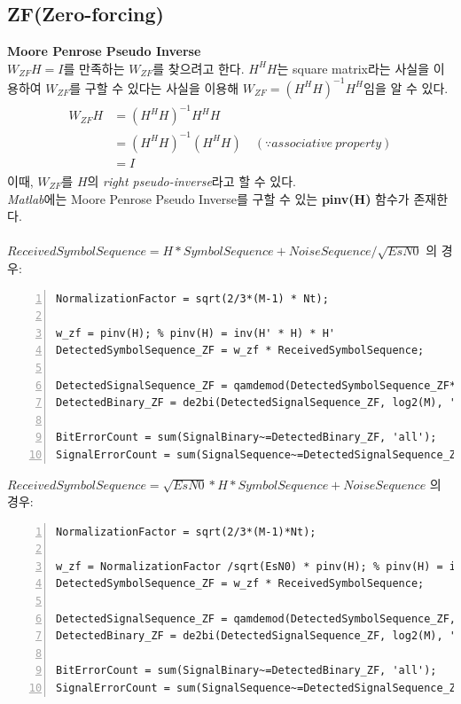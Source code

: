 \documentclass{article}
\newcommand{\bd}{\textbf} %
\begin{document}
\subsection{ZF(Zero-forcing)}
\bd{Moore Penrose Pseudo Inverse}\\
$W_{ZF}H=I$를 만족하는 $W_{ZF}$를 찾으려고 한다. $H^H H$는 square matrix라는 사실을 이용하여 $W_{ZF}$를 구할 수 있다는 사실을 이용해 $W_{ZF}=(H^H H)^{-1}H^H$임을 알 수 있다.
\begin{gather}
	\begin{split}
		W_{ZF}H&=(H^H H)^{-1}H^H H\\
		&=(H^H H)^{-1}(H^H H) \quad (\because associative\ property)\\
		&=I
	\end{split}
\end{gather}
이때, $W_{ZF}$를 $H$의 \textsl{right pseudo-inverse}라고 할 수 있다.\\
\textsl{Matlab}에는 Moore Penrose Pseudo Inverse를 구할 수 있는 \bd{pinv(H)} 함수가 존재한다.\\
\\
$ReceivedSymbolSequence = H * SymbolSequence + NoiseSequence / \sqrt{EsN0}$ 의 경우:
\begin{lstlisting}[style=Matlab-editor, frame=single, numbers=left,]
NormalizationFactor = sqrt(2/3*(M-1) * Nt);

w_zf = pinv(H); % pinv(H) = inv(H' * H) * H'
DetectedSymbolSequence_ZF = w_zf * ReceivedSymbolSequence;

DetectedSignalSequence_ZF = qamdemod(DetectedSymbolSequence_ZF*NormalizationFactor, M);
DetectedBinary_ZF = de2bi(DetectedSignalSequence_ZF, log2(M), 'left-msb');

BitErrorCount = sum(SignalBinary~=DetectedBinary_ZF, 'all');
SignalErrorCount = sum(SignalSequence~=DetectedSignalSequence_ZF, 'all');
\end{lstlisting}
\newpage
\noindent
$ReceivedSymbolSequence = \sqrt{EsN0} * H * SymbolSequence + NoiseSequence$ 의 경우:
\begin{lstlisting}[style=Matlab-editor, frame=single, numbers=left,]
NormalizationFactor = sqrt(2/3*(M-1)*Nt);

w_zf = NormalizationFactor /sqrt(EsN0) * pinv(H); % pinv(H) = inv(H' * H) * H'
DetectedSymbolSequence_ZF = w_zf * ReceivedSymbolSequence;

DetectedSignalSequence_ZF = qamdemod(DetectedSymbolSequence_ZF, M);
DetectedBinary_ZF = de2bi(DetectedSignalSequence_ZF, log2(M), 'left-msb');

BitErrorCount = sum(SignalBinary~=DetectedBinary_ZF, 'all');
SignalErrorCount = sum(SignalSequence~=DetectedSignalSequence_ZF, 'all');
\end{lstlisting}
\end{document}
